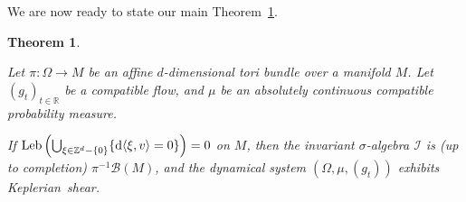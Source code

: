 \documentclass[10pt]{amsart}
\newtheorem{theo}{Theorem}[section]
\theoremstyle{definition}\newtheorem{defi}[theo]{Definition}\newtheorem{rema}[theo]{Remark}\newtheorem{exam}[theo]{Example}\newtheorem{exem}[theo]{Example}\newtheorem{nota}[theo]{Notation}
\DeclareMathOperator{\Leb}{Leb}
\newcommand{\Z}{\mathbb{Z}}
\newcommand{\R}{\mathbb{R}}
\newcommand{\Bcal}{\mathcal{B}}
\newcommand{\Ical}{\mathcal{I}}
\newcommand{\de}{{\rm d}}
\begin{document}
We are now ready to state our main Theorem~\ref{thm:ClassiquePrincipal}.


\begin{theo}\label{thm:ClassiquePrincipal}

Let $\pi: \Omega \to M$ be an affine $d$-dimensional tori bundle over a manifold $M$. Let $(g_t)_{t \in \R}$ be a compatible flow, and $\mu$ be an absolutely continuous compatible probability measure.


If $\Leb \left(\bigcup_{\xi \in \Z^d - \{0\}} \{ \de \langle \xi, v \rangle = 0\}\right) = 0$ on $M$, then the invariant $\sigma$-algebra $\Ical$ is (up to completion) $\pi^{-1} \Bcal (M)$, and the dynamical system $(\Omega, \mu, (g_t))$ exhibits Keplerian~shear.
\end{theo}
\end{document}
